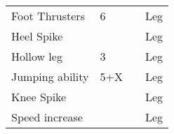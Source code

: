 \documentclass[twoside]{book}
\begin{document}
\begin{longtable}{p{1.25in}p{2em}ll}
  \raggedright
           Foot Thrusters 
  &
   6 
  &
  
  &
   Leg 
  \tabularnewline
      
  \raggedright
           Heel Spike 
  &
  
  &
  
  &
   Leg 
  \tabularnewline
      
  \raggedright
           Hollow leg 
  &
   3 
  &
  
  &
   Leg 
  \tabularnewline
      
  \raggedright
           Jumping ability 
  &
   5+X 
  &
  
  &
   Leg 
  \tabularnewline
      
  \raggedright
           Knee Spike 
  &
  
  &
  
  &
   Leg 
  \tabularnewline
      
  \raggedright
           Speed increase 
  &
  
  &
  
  &
   Leg 
  \tabularnewline
      
\end{longtable}
    
\end{document}
